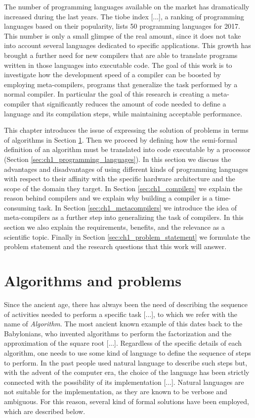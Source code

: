 The number of programming languages available on the market has dramatically increased during the last years. The tiobe index [...], a ranking of programming languages based on their popularity, lists 50 programming languages for 2017. This number is only a small glimpse of the real amount, since it does not take into account several languages dedicated to specific applications. This growth has brought a further need for new compilers that are able to translate programs written in those languages into executable code. The goal of this work is to investigate how the development speed of a compiler can be boosted by employing meta-compilers, programs that generalize the task performed by a normal compiler. In particular the goal of this research is creating a meta-compiler that significantly reduces the amount of code needed to define a language and its compilation steps, while maintaining acceptable performance.

This chapter introduces the issue of expressing the solution of problems in terms of algorithms in Section \ref{sec:ch1_algorithms}. Then we proceed by defining how the semi-formal definition of an algorithm must be translated into code executable by a processor (Section \ref{sec:ch1_programming_languages}). In this section we discuss the advantages and disadvantages of using different kinds of programming languages with respect to their affinity with the specific hardware architecture and the scope of the domain they target. In Section \ref{sec:ch1_compilers} we explain the reason behind compilers and we explain why building a compiler is a time-consuming task. In Section \ref{sec:ch1_metacompilers} we introduce the idea of meta-compilers as a further step into generalizing the task of compilers. In this section we also explain the requirements, benefits, and the relevance as a scientific topic. Finally in Section \ref{sec:ch1_problem_statement} we formulate the problem statement and the research questions that this work will answer.

\section{Algorithms and problems}
\label{sec:ch1_algorithms}
Since the ancient age, there has always been the need of describing the sequence of activities needed to perform a specific task [...], to which we refer with the name of \textit{Algorithm}. The most ancient known example of this dates back to the Babylonians, who invented algorithms to perform the factorization and the approximation of the square root [...]. Regardless of the specific details of each algorithm, one needs to use some kind of language  to define the sequence of steps to perform. In the past people used natural language to describe such steps but, with the advent of the computer era, the choice of the language has been strictly connected with the possibility of its implementation [...]. Natural languages are not suitable for the implementation, as they are known to be verbose and ambiguous. For this reason, several kind of formal solutions have been employed, which are described below.

